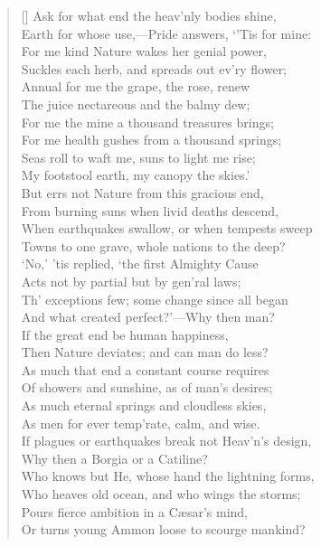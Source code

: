 \begin{verse}[\versewidth]
Ask for what end the heav'nly bodies shine,\\
Earth for whose use,---Pride answers, `'Tis for mine:\\
For me kind Nature wakes her genial power,\\
Suckles each herb, and spreads out ev'ry flower;\\
Annual for me the grape, the rose, renew\\
The juice nectareous and the balmy dew;\\
For me the mine a thousand treasures brings;\\
For me health gushes from a thousand springs;\\
Seas roll to waft me, suns to light me rise;\\
My footstool earth, my canopy the skies.'\\
\vin But errs not Nature from this gracious end,\\
From burning suns when livid deaths descend,\\
When earthquakes swallow, or when tempests sweep\\
Towns to one grave, whole nations to the deep?\\
`No,' 'tis replied, `the first Almighty Cause\\
Acts not by partial but by gen'ral laws;\\
Th' exceptions few; some change since all began\\
And what created perfect?'---Why then man?\\
If the great end be human happiness,\\
Then Nature deviates; and can man do less?\\
As much that end a constant course requires\\
Of showers and sunshine, as of man's desires;\\
As much eternal springs and cloudless skies,\\
As men for ever temp'rate, calm, and wise.\\
If plagues or earthquakes break not Heav'n's design,\\
Why then a Borgia or a Catiline?\\
Who knows but He, whose hand the lightning forms,\\
Who heaves old ocean, and who wings the storms;\\
Pours fierce ambition in a C\ae sar's mind,\\
Or turns young Ammon loose to scourge mankind?\\

\end{verse}
